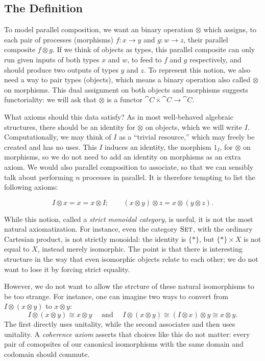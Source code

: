 \subsection{The Definition}
\label{sec:monoidal definition}

To model parallel composition, we want an binary operation $\otimes$ which
assigns, to each pair of processes (morphisms) $f:x\to y$ and $g:w\to z$, their
parallel composite $f\otimes g$. If we think of objects as types, this parallel
composite can only run given inputs of both types $x$ and $w$, to feed to $f$
and $g$ respectively, and should produce two outputs of types $y$ and $z$. To
represent this notion, we also need a way to pair types (objects), which means a
binary operation also called $\otimes$ on morphisms. This dual assignment on
both objects and morphisms suggests functoriality: we will ask that $\otimes$ is
a functor $\cat{C}\times\cat{C}\to\cat{C}$.

What axioms should this data satisfy? As in most well-behaved algebraic
structures, there should be an identity for $\otimes$ on objects, which we will
write $I$. Computationally, we may think of $I$ as a ``trivial resource,'' which
may freely be created and has no uses. This $I$ induces an identity, the
morphism $1_I$, for $\otimes$ on morphisms, so we do not need to add an identity
on morphisms as an extra axiom. We would also parallel composition to associate,
so that we can sensibly talk about performing $n$ processes in parallel. It is
therefore tempting to list the following axioms:

\[
  I\otimes x = x = x\otimes I; \quad\quad (x\otimes y)\otimes z =
  x\otimes(y\otimes z).
\]

While this notion, called a \emph{strict monoidal category}, is useful, it is
not the most natural axiomatization. For instance, even the category
${\textsc{\text{Set}}}$, with the ordinary Cartesian product, is not strictly monoidal: the
identity is $\{*\}$, but $\{*\}\times X$ is not equal to $X$, instead merely
isomorphic. The point is that there is interesting structure in the way that
even isomorphic objects relate to each other; we do not want to lose it by
forcing strict equality.

However, we do not want to allow the strcture of these natural isomorphisms to
be too strange. For instance, one can imagine two ways to convert from $I\otimes (x\otimes y)$
to $x\otimes y$: \[
  I\otimes(x\otimes y) \cong x\otimes y \quad\text{ and }\quad
  I\otimes(x\otimes y) \cong (I\otimes x)\otimes y \cong x\otimes y.
\]The first directly uses unitality, while the second associates and then uses
unitality. A \emph{coherence axiom} asserts that choices like this do not
matter: every pair of comopsites of our canonical isomorphisms with the same
domain and codomain should commute.

